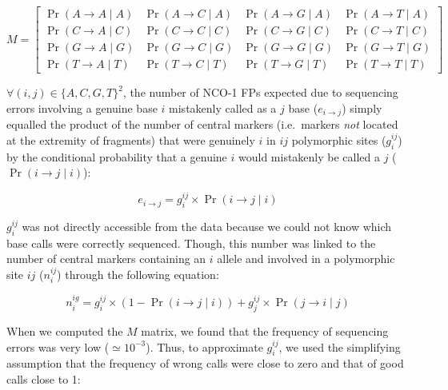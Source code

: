 \begin{equation*}
M = \begin{bmatrix}
\Pr( A\rightarrow A \mid A) & \Pr( A\rightarrow C \mid A) & \Pr( A\rightarrow G \mid A) & \Pr( A\rightarrow T \mid A) \\
\Pr( C\rightarrow A \mid C) & \Pr( C\rightarrow C \mid C) & \Pr( C\rightarrow G \mid C) & \Pr( C\rightarrow T \mid C) \\
\Pr( G\rightarrow A \mid G) & \Pr( G\rightarrow C \mid G) & \Pr( G\rightarrow G \mid G) & \Pr( G\rightarrow T \mid G) \\
\Pr( T\rightarrow A \mid T) & \Pr( T\rightarrow C \mid T) & \Pr( T\rightarrow G \mid T) & \Pr( T\rightarrow T \mid T) 
\end{bmatrix}
\end{equation*}






$\forall (i,j) \in \{A, C, G, T\}^2$, the number of NCO-1 FPs expected due to sequencing errors involving a genuine base $i$ mistakenly called as a $j$ base ($e_{i\rightarrow j}$) simply equalled the product of the number of central markers (i.e.\ markers \textit{not} located at the extremity of fragments) that were genuinely $i$ in $ij$ polymorphic sites ($g_{i}^{ij}$) by the conditional probability that a genuine $i$ would mistakenly be called a $j$ ($\Pr( i\rightarrow j \mid i )$):

\begin{equation} \label{eq:nb-errors}
	e_{i\rightarrow j} = g_{i}^{ij} \times \Pr( i\rightarrow j \mid i )
\end{equation}


$g_{i}^{ij}$ was not directly accessible from the data because we could not know which base calls were correctly sequenced.
Though, this number was linked to the number of central markers containing an $i$ allele and involved in a polymorphic site $ij$ ($n_{i}^{ij}$) through the following equation:

\begin{equation} \label{eq:genuine-to-called}
	n_{i}^{ig} = g_{i}^{ij} \times ( 1 - \Pr( i\rightarrow j \mid i ) ) + g_{j}^{ij} \times \Pr( j\rightarrow i \mid j )
\end{equation}


When we computed the $M$ matrix, we found that the frequency of sequencing errors was very low ($\simeq 10^{-3}$).
Thus, to approximate $g_{i}^{ij}$, we used the simplifying assumption that the frequency of wrong calls were close to zero and that of good calls close to 1:

